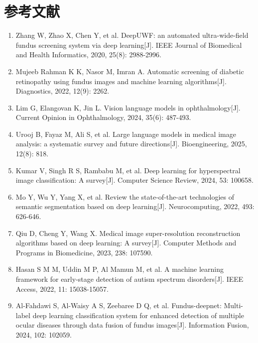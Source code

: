 \section{参考文献}\label{ux53c2ux8003ux6587ux732e}

\begin{enumerate}
\def\labelenumi{\arabic{enumi}.}
\item
  \protect{}\label{_Ref213949315}{}Zhang W, Zhao X, Chen Y, et al. DeepUWF: an automated ultra-wide-field fundus screening system via deep learning{[}J{]}. IEEE Journal of Biomedical and Health Informatics, 2020, 25(8): 2988-2996.
\item
  \protect{}\label{_RefRahman2022MLFundus}{}Mujeeb Rahman K K, Nasor M, Imran A. Automatic screening of diabetic retinopathy using fundus images and machine learning algorithms{[}J{]}. Diagnostics, 2022, 12(9): 2262.
\item
  \protect{}\label{_RefLim2024VLVOphthalmology}{}Lim G, Elangovan K, Jin L. Vision language models in ophthalmology{[}J{]}. Current Opinion in Ophthalmology, 2024, 35(6): 487-493.
\item
  \protect{}\label{_RefUrooj2025LLMMedicalImage}{}Urooj B, Fayaz M, Ali S, et al. Large language models in medical image analysis: a systematic survey and future directions{[}J{]}. Bioengineering, 2025, 12(8): 818.
\item
  \protect{}\label{_Ref213871637}{}Kumar V, Singh R S, Rambabu M, et al. Deep learning for hyperspectral image classification: A survey{[}J{]}. Computer Science Review, 2024, 53: 100658.
\item
  \protect{}\label{_Ref213948625}{}Mo Y, Wu Y, Yang X, et al. Review the state-of-the-art technologies of semantic segmentation based on deep learning{[}J{]}. Neurocomputing, 2022, 493: 626-646.
\item
  \protect{}\label{_Ref213948898}{}Qiu D, Cheng Y, Wang X. Medical image super-resolution reconstruction algorithms based on deep learning: A survey{[}J{]}. Computer Methods and Programs in Biomedicine, 2023, 238: 107590.
\item
  \protect{}\label{_Ref213949262}{}Hasan S M M, Uddin M P, Al Mamun M, et al. A machine learning framework for early-stage detection of autism spectrum disorders{[}J{]}. IEEE Access, 2022, 11: 15038-15057.
\item
  \protect{}\label{_Ref213949362}{}Al-Fahdawi S, Al-Waisy A S, Zeebaree D Q, et al. Fundus-deepnet: Multi-label deep learning classification system for enhanced detection of multiple ocular diseases through data fusion of fundus images{[}J{]}. Information Fusion, 2024, 102: 102059.

\end{enumerate}
